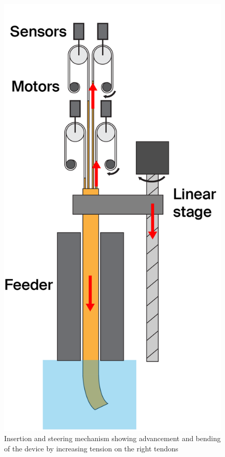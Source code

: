 \begin{figure} 
    \centering
    \includegraphics[width=\linewidth]{images/Hardware/insertion.PNG}
    \caption{Insertion and steering mechanism showing advancement and bending of the device by increasing tension on the right tendons}
    \label{fig:insertionschematic}
\end{figure}
